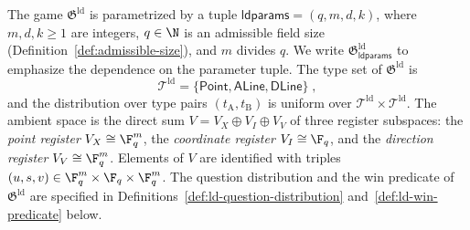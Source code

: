 \begin{definition}\label{def:ld-game}
	\leanok
	The game $\mathfrak{G}^{\mathrm{ld}}$ is parametrized by a tuple $\mathsf{ldparams} = (q,m,d,k)$, where $m, d, k \ge 1$ are integers, $q \in \N$ is an admissible field size (Definition~\ref{def:admissible-size}), and $m$ divides $q$. We write $\mathfrak{G}^{\mathrm{ld}}_{\mathsf{ldparams}}$ to emphasize the dependence on the parameter tuple. The type set of $\mathfrak{G}^{\mathrm{ld}}$ is
	\[
		\mathcal T^{\mathrm{ld}} = \{\mathsf{Point}, \mathsf{ALine}, \mathsf{DLine}\}\;,
	\]
	and the distribution over type pairs $(t_{\mathrm A}, t_{\mathrm B})$ is uniform over $\mathcal T^{\mathrm{ld}} \times \mathcal T^{\mathrm{ld}}$. The ambient space is the direct sum $V = V_X \oplus V_I \oplus V_V$ of three register subspaces: the \emph{point register} $V_X \cong \F_q^m$, the \emph{coordinate register} $V_I \cong \F_q$, and the \emph{direction register} $V_V \cong \F_q^m$. Elements of $V$ are identified with triples $(u,s,v) \in \F_q^m \times \F_q \times \F_q^m$. The question distribution and the win predicate of $\mathfrak{G}^{\mathrm{ld}}$ are specified in Definitions~\ref{def:ld-question-distribution} and~\ref{def:ld-win-predicate} below.
\end{definition}

